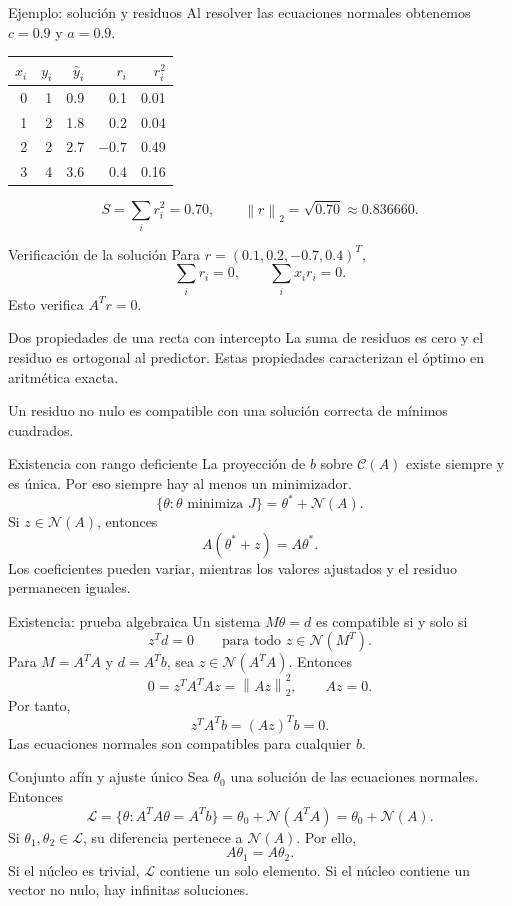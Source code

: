 \documentclass[aspectratio=169,12pt]{beamer}
\newcommand{\norm}[1]{\left\lVert#1\right\rVert}
\begin{document}
\begin{frame}{Ejemplo: solución y residuos}
Al resolver las ecuaciones normales obtenemos $c=0.9$ y $a=0.9$.
\begin{center}\begin{tabular}{rrrrr}\toprule
$x_i$ & $y_i$ & $\widehat y_i$ & $r_i$ & $r_i^2$\\\midrule
0 & 1 & 0.9 & 0.1 & 0.01\\
1 & 2 & 1.8 & 0.2 & 0.04\\
2 & 2 & 2.7 & $-0.7$ & 0.49\\
3 & 4 & 3.6 & 0.4 & 0.16\\\bottomrule
\end{tabular}\end{center}
\[
S=\sum_i r_i^2=0.70,\qquad \norm{r}_2=\sqrt{0.70}\approx0.836660.
\]
\end{frame}

\begin{frame}{Verificación de la solución}
Para $r=(0.1,0.2,-0.7,0.4)^T$,
\[
\sum_i r_i=0,\qquad \sum_i x_ir_i=0.
\]
Esto verifica $A^Tr=0$.
\begin{block}{Dos propiedades de una recta con intercepto}
La suma de residuos es cero y el residuo es ortogonal al predictor.
Estas propiedades caracterizan el óptimo en aritmética exacta.
\end{block}
Un residuo no nulo es compatible con una solución correcta de mínimos cuadrados.
\end{frame}

\begin{frame}{Existencia con rango deficiente}
La proyección de $b$ sobre $\mathcal C(A)$ existe siempre y es única.
Por eso siempre hay al menos un minimizador.
\[
\{\theta:\theta\text{ minimiza }J\}
=\theta^*+\mathcal N(A).
\]
Si $z\in\mathcal N(A)$, entonces
\[
A(\theta^*+z)=A\theta^*.
\]
Los coeficientes pueden variar, mientras los valores ajustados y el residuo
permanecen iguales.
\end{frame}

\begin{frame}{Existencia: prueba algebraica}
Un sistema $M\theta=d$ es compatible si y solo si
\[
z^Td=0\qquad\text{para todo }z\in\mathcal N(M^T).
\]
Para $M=A^TA$ y $d=A^Tb$, sea $z\in\mathcal N(A^TA)$.
Entonces
\[
0=z^TA^TAz=\norm{Az}_2^2,\qquad Az=0.
\]
Por tanto,
\[
z^TA^Tb=(Az)^Tb=0.
\]
Las ecuaciones normales son compatibles para cualquier $b$.
\end{frame}

\begin{frame}{Conjunto afín y ajuste único}
Sea $\theta_0$ una solución de las ecuaciones normales. Entonces
\[
\mathcal L=\{\theta:A^TA\theta=A^Tb\}
=\theta_0+\mathcal N(A^TA)=\theta_0+\mathcal N(A).
\]
Si $\theta_1,\theta_2\in\mathcal L$, su diferencia pertenece a $\mathcal N(A)$.
Por ello,
\[
A\theta_1=A\theta_2.
\]
Si el núcleo es trivial, $\mathcal L$ contiene un solo elemento.
Si el núcleo contiene un vector no nulo, hay infinitas soluciones.
\end{frame}
\end{document}

